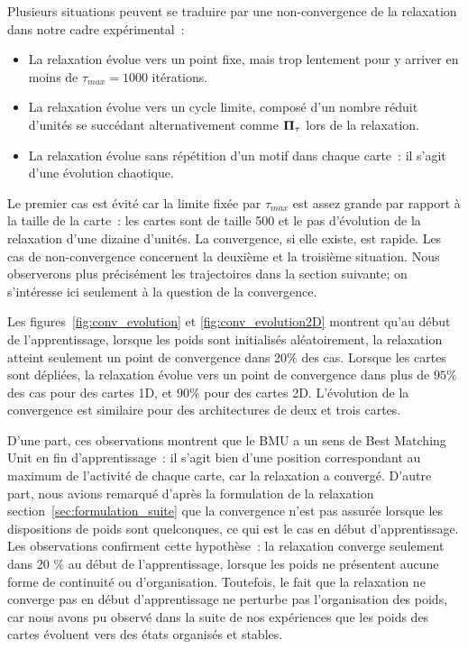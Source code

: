\documentclass[../main]{subfiles}
\begin{document}
Plusieurs situations peuvent se traduire par une non-convergence de la relaxation dans notre cadre expérimental~:
\begin{itemize}
\item La relaxation évolue vers un point fixe, mais trop lentement pour y arriver en moins de $\tau_{max} = 1000$ itérations.
\item La relaxation évolue vers un cycle limite, composé d'un nombre réduit d'unités se succédant alternativement comme $\mathbf{\Pi_\tau}$ lors de la relaxation.
\item La relaxation évolue sans répétition d'un motif dans chaque carte~: il s'agit d'une évolution chaotique.
\end{itemize}

Le premier cas est évité car la limite fixée par $\tau_{max}$ est assez grande par rapport à la taille de la carte~: les cartes sont de taille 500 et le pas d'évolution de la relaxation d'une dizaine d'unités. 
La convergence, si elle existe, est rapide. Les cas de non-convergence concernent la deuxième et la troisième situation. 
Nous observerons plus précisément les trajectoires dans la section suivante; on s'intéresse ici seulement à la question de la convergence.

Les figures~\ref{fig:conv_evolution} et \ref{fig:conv_evolution2D} montrent qu'au début de l'apprentissage, lorsque les poids sont initialisés aléatoirement, la relaxation atteint seulement un point de convergence dans 20\% des cas. Lorsque les cartes sont dépliées, la relaxation évolue vers un point de convergence dans plus de $95\%$ des cas pour des cartes 1D, et $90\%$ pour des cartes 2D. L'évolution de la convergence est similaire pour des architectures de deux et trois cartes.

D'une part, ces observations montrent que le BMU a un sens de Best Matching Unit en fin d'apprentissage~: il s'agit bien d'une position correspondant au maximum de l'activité de chaque carte, car la relaxation a convergé.
D'autre part, nous avions remarqué d'après la formulation de la relaxation section~\ref{sec:formulation_suite} que la convergence n'est pas assurée lorsque les dispositions de poids sont quelconques, ce qui est  le cas en début d'apprentissage. 
Les observations confirment cette hypothèse~: la relaxation converge seulement dans 20 \% au début de l'apprentissage, lorsque les poids ne présentent aucune forme de continuité ou d'organisation.
Toutefois, le fait que la relaxation ne converge pas en début d'apprentissage ne perturbe pas l'organisation des poids, car nous avons pu observé dans la suite de nos expériences que les poids des cartes évoluent vers des états organisés et stables.
\end{document}
